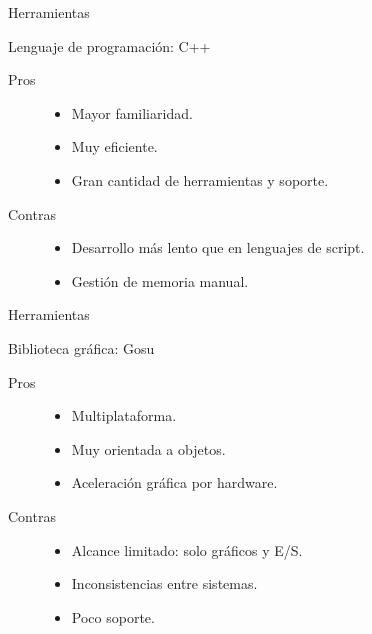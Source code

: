\begin{frame}{Herramientas}
  \begin{block}{Lenguaje de programación: C++}
    \begin{description}
    \item[Pros]     
      \begin{itemize}
      \item Mayor familiaridad.
      \item Muy eficiente.
      \item Gran cantidad de herramientas y soporte.
      \end{itemize}
      \medskip
    \item[Contras]
      \begin{itemize}
      \item Desarrollo más lento que en lenguajes de script.
      \item Gestión de memoria manual.
      \end{itemize}
    \end{description}
  \end{block}
\end{frame}

\begin{frame}{Herramientas}
  \begin{block}{Biblioteca gráfica: Gosu}
    \begin{description}
    \item[Pros]
      \begin{itemize}
      \item Multiplataforma.
      \item Muy orientada a objetos.
      \item Aceleración gráfica por hardware.
      \end{itemize}

      \medskip


    \item[Contras]
      \begin{itemize}
      \item Alcance limitado: solo gráficos y E/S.
      \item Inconsistencias entre sistemas.
      \item Poco soporte.
      \end{itemize}

    \end{description}
  \end{block}
\end{frame}

